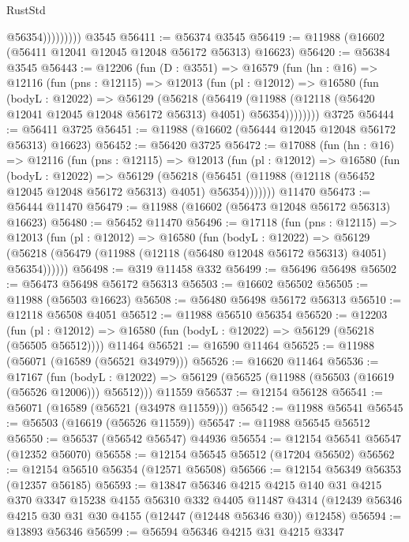 \begin{lexlean}{RustStd}
\begin{coremodule}
                      @56354)))))))))
    @3545
@56411 := @56374 @3545
@56419 := @11988 (@16602 (@56411 @12041 @12045 @12048 @56172 @56313) @16623)
@56420 := @56384 @3545
@56443 := @12206
    (fun (D : @3551) =>
    @16579
      (fun (hn : @16) =>
      @12116
        (fun (pns : @12115) =>
        @12013
          (fun (pl : @12012) =>
          @16580
            (fun (bodyL : @12022) =>
            @56129
              (@56218
                (@56419
                  (@11988 (@12118 (@56420 @12041 @12045 @12048 @56172 @56313) @4051) @56354))))))))
    @3725
@56444 := @56411 @3725
@56451 := @11988 (@16602 (@56444 @12045 @12048 @56172 @56313) @16623)
@56452 := @56420 @3725
@56472 := @17088
    (fun (hn : @16) =>
    @12116
      (fun (pns : @12115) =>
      @12013
        (fun (pl : @12012) =>
        @16580
          (fun (bodyL : @12022) =>
          @56129
            (@56218
              (@56451 (@11988 (@12118 (@56452 @12045 @12048 @56172 @56313) @4051) @56354)))))))
    @11470
@56473 := @56444 @11470
@56479 := @11988 (@16602 (@56473 @12048 @56172 @56313) @16623)
@56480 := @56452 @11470
@56496 := @17118
    (fun (pns : @12115) =>
    @12013
      (fun (pl : @12012) =>
      @16580
        (fun (bodyL : @12022) =>
        @56129 (@56218 (@56479 (@11988 (@12118 (@56480 @12048 @56172 @56313) @4051) @56354))))))
@56498 := @319 @11458 @332
@56499 := @56496 @56498
@56502 := @56473 @56498 @56172 @56313
@56503 := @16602 @56502
@56505 := @11988 (@56503 @16623)
@56508 := @56480 @56498 @56172 @56313
@56510 := @12118 @56508 @4051
@56512 := @11988 @56510 @56354
@56520 := @12203
    (fun (pl : @12012) => @16580 (fun (bodyL : @12022) => @56129 (@56218 (@56505 @56512))))
    @11464
@56521 := @16590 @11464
@56525 := @11988 (@56071 (@16589 (@56521 @34979)))
@56526 := @16620 @11464
@56536 := @17167
    (fun (bodyL : @12022) => @56129 (@56525 (@11988 (@56503 (@16619 (@56526 @12006))) @56512)))
    @11559
@56537 := @12154 @56128
@56541 := @56071 (@16589 (@56521 (@34978 @11559)))
@56542 := @11988 @56541
@56545 := @56503 (@16619 (@56526 @11559))
@56547 := @11988 @56545 @56512
@56550 := @56537 (@56542 @56547) @44936
@56554 := @12154 @56541 @56547 (@12352 @56070)
@56558 := @12154 @56545 @56512 (@17204 @56502)
@56562 := @12154 @56510 @56354 (@12571 @56508)
@56566 := @12154 @56349 @56353 (@12357 @56185)
@56593 := @13847
    @56346
    @4215
    @4215
    @140
    @31
    @4215
    @370
    @3347
    @15238
    @4155
    @56310
    @332
    @4405
    @11487
    @4314
    (@12439 @56346 @4215 @30 @31 @30 @4155 (@12447 (@12448 @56346 @30)) @12458)
@56594 := @13893 @56346
@56599 := @56594 @56346 @4215 @31 @4215 @3347

\end{coremodule}
\end{lexlean}
